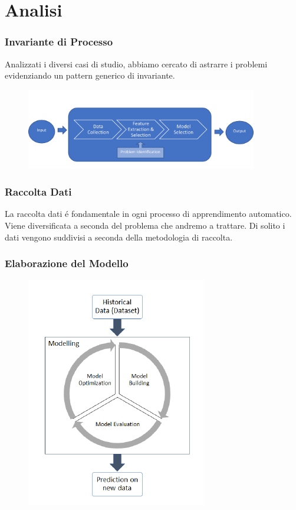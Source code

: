 \documentclass[xcolor=dvipsnames]{beamer}
\begin{document}
\section{Analisi}

\begin{frame}
\frametitle{Invariante di Processo}
   Analizzati i diversi casi di studio, abbiamo cercato di astrarre i problemi evidenziando un pattern generico di invariante.
    \begin{figure}[htbp]
        \includegraphics[width=0.9\textwidth]{Immagine3.png}
    \end{figure}
\end{frame}

\begin{frame}
    \frametitle{Raccolta Dati}
    La raccolta dati é fondamentale in ogni processo di apprendimento automatico.
    Viene diversificata a seconda del problema che andremo a trattare.
    Di solito i dati vengono suddivisi a seconda della \alert{metodologia di raccolta}.
\end{frame}

\begin{frame}
    \frametitle{Elaborazione del Modello}
    \begin{figure}[htbp]
        \includegraphics{MLProcess.png}
    \end{figure}
\end{frame}
\end{document}
